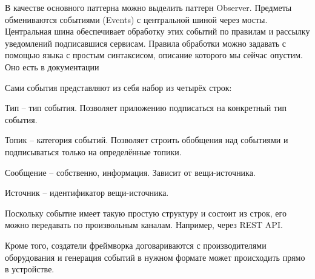 В качестве основного паттерна можно выделить паттерн Observer.
Предметы обмениваются событиями (Events) с центральной шиной через мосты.
Центральная шина обеспечивает обработку этих событий по правилам и рассылку уведомлений подписавшися сервисам.
Правила обработки можно задавать с помощью языка с простым синтаксисом, описание которого мы сейчас опустим. Оно есть в документации \cite{EclipseRules}

Сами события представляют из себя набор из четырёх строк:
\begin{list}{}{}
    \item Тип -- тип события. Позволяет приложению подписаться на конкретный тип события.
    \item Топик -- категория событий. Позволяет строить обобщения над событиями и подписываться только на определённые топики.
    \item Сообщение -- собственно, информация. Зависит от вещи-источника.
    \item Источник -- идентификатор вещи-источника.
\end{list}
Поскольку событие имеет такую простую структуру и состоит из строк, его можно передавать по произвольным каналам. Например, через REST API.

Кроме того, создатели фреймворка договариваются с производителями оборудования и генерация событий в нужном формате может происходить прямо в устройстве.
